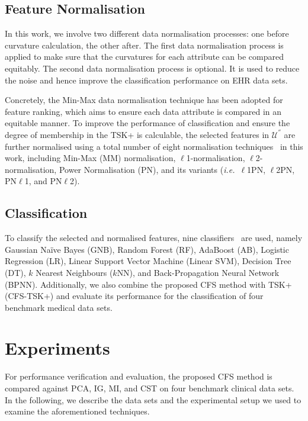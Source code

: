 \documentclass{article}
\newcommand{\zzie}{\emph{i.e.}~}
\newcommand*{\1}{\textcolor{magenta}}
\begin{document}
	\subsection{Feature Normalisation} \label{sec:featNorm}
	In this work, we involve two different data normalisation processes: one before curvature calculation, the other after. The first data normalisation process is applied to make sure that the curvatures for each attribute can be compared equitably. The second data normalisation process is optional. It is used to reduce the noise and hence improve the classification performance on EHR data sets. 
	
	Concretely, the Min-Max data normalisation technique has been adopted for feature ranking, which aims to ensure each data attribute is compared in an equitable manner. To improve the performance of classification and ensure the degree of membership in the TSK+ is calculable,
	the selected features in $\mathcal{U}^{''}$ are further normalised using a total number of eight normalisation techniques~\cite{8858838} in this work, including Min-Max (MM) normalisation, $\ell$1-normalisation, $\ell$2-normalisation, Power Normalisation (PN), and its variants (\zzie $\ell$1PN, $\ell$2PN, PN$\ell$1, and PN$\ell$2).
	
	\subsection{Classification} \label{sec:featClasf}
	To classify the selected and normalised features, nine classifiers~\cite{zuo2018grooming,8858838} are used, namely Gaussian Na\"ive Bayes (GNB), Random Forest (RF), AdaBoost (AB), Logistic Regression (LR), Linear Support Vector Machine (Linear SVM), Decision Tree (DT), $k$ Nearest Neighbours ($k$NN), and Back-Propagation Neural Network (BPNN). Additionally, we also combine the proposed CFS method with TSK+ (CFS-TSK+) and evaluate its performance for the classification of four benchmark medical data sets.
	
	\section{Experiments} \label{sec:exp}
	For performance verification and evaluation, the proposed CFS method is compared against PCA, IG, MI, and CST on four benchmark clinical data sets. In the following, we describe the data sets and the experimental setup we used to examine the aforementioned techniques.
	
\end{document}
